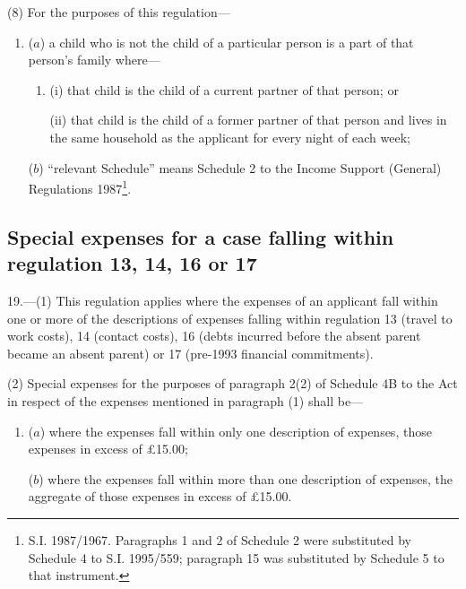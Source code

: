 \documentclass[12pt,a4paper]{article}
\begin{document}
(8) For the purposes of this regulation—
\begin{enumerate}\item[]

($a$) a child who is not the child of a particular person is a part of that person’s family where—
\begin{enumerate}\item[]
(i) that child is the child of a current partner of that person; or

(ii) that child is the child of a former partner of that person and lives in the same household as the applicant for every night of each week;
\end{enumerate}

($b$) “relevant Schedule” means Schedule 2 to the Income Support (General)
Regulations 1987\footnote{\frenchspacing S.I. 1987/1967. Paragraphs 1 and 2 of Schedule 2 were substituted by Schedule 4 to S.I. 1995/559; paragraph 15 was substituted by Schedule 5 to that instrument.}.
\end{enumerate}


\subsection[19. Special expenses for a case falling within regulation 13, 14, 16 or 17]{Special expenses for a case falling within regulation 13, 14, 16 or 17}

19.—(1)
This regulation applies where the expenses of an applicant fall within one or
more of the descriptions of expenses falling within regulation 13 (travel to
work costs), 14 (contact costs), 16 (debts incurred before the absent parent
became an absent parent) or 17 (pre-1993 financial commitments).

(2) Special expenses for the purposes of paragraph 2(2) of Schedule 4B to the
Act in respect of the expenses mentioned in paragraph (1) shall be—
\begin{enumerate}\item[]
($a$) where the expenses fall within only one description of expenses, those
expenses in excess of £15.00;

($b$) where the expenses fall within more than one description of expenses, the
aggregate of those expenses in excess of £15.00.
\end{enumerate}
\end{document}
